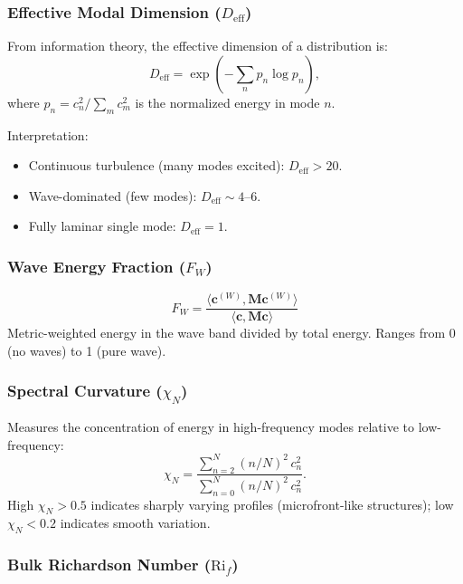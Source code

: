 \documentclass[11pt,a4paper]{article}
\begin{document}
\subsubsection{Effective Modal Dimension ($D_{\mathrm{eff}}$)}

From information theory, the effective dimension of a distribution is:
\begin{equation}
D_{\mathrm{eff}} = \exp\left( -\sum_n p_n \log p_n \right),
\label{eq:d_eff}
\end{equation}
where $p_n = c_n^2 / \sum_m c_m^2$ is the normalized energy in mode $n$.

Interpretation:
\begin{itemize}
  \item Continuous turbulence (many modes excited): $D_{\mathrm{eff}} > 20$.
  \item Wave-dominated (few modes): $D_{\mathrm{eff}} \sim 4$--$6$.
  \item Fully laminar single mode: $D_{\mathrm{eff}} = 1$.
\end{itemize}

\subsubsection{Wave Energy Fraction ($F_W$)}

\begin{equation}
F_W = \frac{\langle \mathbf{c}^{(W)}, \mathbf{M} \mathbf{c}^{(W)} \rangle}{\langle \mathbf{c}, \mathbf{M} \mathbf{c} \rangle}
\label{eq:f_w}
\end{equation}
Metric-weighted energy in the wave band divided by total energy. Ranges from 0 (no waves) to 1 (pure wave).

\subsubsection{Spectral Curvature ($\chi_N$)}

Measures the concentration of energy in high-frequency modes relative to low-frequency:
\begin{equation}
\chi_N = \frac{\sum_{n=2}^{N} (n/N)^2 \, c_n^2}{\sum_{n=0}^{N} (n/N)^2 \, c_n^2}.
\label{eq:chi_n}
\end{equation}
High $\chi_N > 0.5$ indicates sharply varying profiles (microfront-like structures); low $\chi_N < 0.2$ indicates smooth variation.

\subsubsection{Bulk Richardson Number ($\mathrm{Ri}_f$)}
\end{document}
